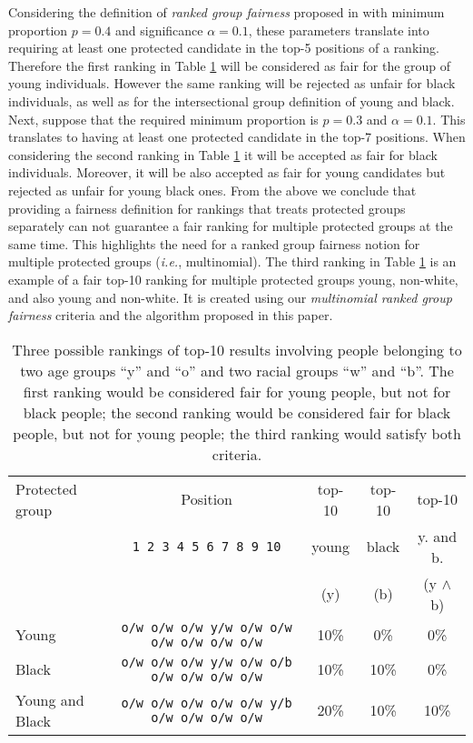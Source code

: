 	Considering the definition of \textit{ranked group fairness} proposed in \cite{zehlike2017fair} with minimum proportion $p=0.4$ and significance $\alpha=0.1$, these parameters translate into requiring at least one protected candidate in the top-5 positions of a ranking.
	Therefore the first ranking in Table \ref{tbl:multinomial_intro_example} will be considered as fair for the group of young individuals.
	However the same ranking will be rejected as unfair for black individuals, as well as for the intersectional group definition of young and black.
	Next, suppose that the required minimum proportion is $p = 0.3$ and $\alpha = 0.1$. This translates to having at least one protected candidate in the top-7 positions.
	When considering the second ranking in Table \ref{tbl:multinomial_intro_example} it will be accepted as fair for black individuals. Moreover, it will be also accepted as fair for young candidates but rejected as unfair for young black ones.
	From the above we conclude that providing a fairness definition for rankings that treats protected groups separately can not guarantee a fair ranking for multiple protected groups at the same time. This highlights the need for a ranked group fairness notion for multiple protected groups ({\em i.e.}, multinomial).
	The third ranking in Table \ref{tbl:multinomial_intro_example} is an example of a fair top-10 ranking for multiple protected groups young, non-white, and also young and non-white. It is created using our \textit{multinomial ranked group fairness} criteria and the algorithm proposed in this paper.
\medskip
\begin{table}[t]
	\caption{Three possible rankings of top-10 results involving people belonging to two age groups ``y'' and ``o'' and two racial groups ``w'' and ``b''. The first ranking would be considered fair for young people, but not for black people; the second ranking would be considered fair for black people, but not for young people; the third ranking would satisfy both criteria.
		\label{tbl:multinomial_intro_example}}
	\centering\small\begin{tabular}{lcccc}\toprule
		Protected group & Position					  & top-10 & top-10  & top-10 \\
		& \texttt{1 2 3 4 5 6 7 8 9 10} & young & black & y. and b. \\
		&                               &  (y)  & (b)  &  (y $\wedge$ b)\\
		\midrule
		Young  & \texttt{o/w o/w o/w y/w o/w o/w o/w o/w o/w o/w} & 10\% & 0\% & 0\% \\
		Black & \texttt{o/w o/w o/w y/w o/w o/b o/w o/w o/w o/w} & 10\% & 10\% & 0\% \\
		Young and Black & \texttt{o/w o/w o/w o/w o/w y/b o/w o/w o/w o/w} & 20\% & 10\% & 10\% \\
		\bottomrule
	\end{tabular}

\end{table}


